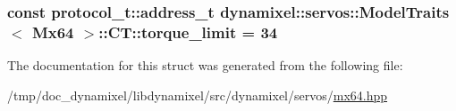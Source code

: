 \subsubsection[{torque\+\_\+limit}]{\setlength{\rightskip}{0pt plus 5cm}const {\bf protocol\+\_\+t\+::address\+\_\+t} {\bf dynamixel\+::servos\+::\+Model\+Traits}$<$ {\bf Mx64} $>$\+::C\+T\+::torque\+\_\+limit = 34\hspace{0.3cm}{\ttfamily [static]}}\label{structdynamixel_1_1servos_1_1_model_traits_3_01_mx64_01_4_1_1_c_t_a72169733dfbb24498f22aa2e2c610933}


The documentation for this struct was generated from the following file\+:\begin{DoxyCompactItemize}
\item 
/tmp/doc\+\_\+dynamixel/libdynamixel/src/dynamixel/servos/\hyperlink{mx64_8hpp}{mx64.\+hpp}\end{DoxyCompactItemize}

